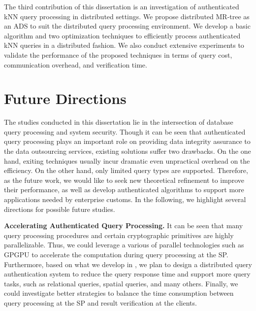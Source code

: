 The third contribution of this dissertation is an investigation of authenticated kNN query processing in distributed settings. We propose distributed MR-tree as an ADS to suit the distributed query processing environment. We develop a basic algorithm and two optimization techniques to efficiently process authenticated kNN queries in a distributed fashion. We also conduct extensive experiments to validate the performance of the proposed techniques in terms of query cost, communication overhead, and verification time.

\section{Future Directions}

The studies conducted in this dissertation lie in the intersection of database query processing and system security. Though it can be seen that authenticated query processing plays an important role on providing data integrity assurance to the data outsourcing services, existing solutions suffer two drawbacks. On the one hand, exiting techniques usually incur dramatic even unpractical overhead on the efficiency. On the other hand, only limited query types are supported. Therefore, as the future work, we would like to seek new theoretical refinement to improve their performance, as well as develop authenticated algorithms to support more applications needed by enterprise customs. In the following, we highlight several directions for possible future studies.

\textbf{Accelerating Authenticated Query Processing.}
It can be seen that many query processing procedures and certain cryptographic primitives are highly parallelizable. Thus, we could leverage a various of parallel technologies such as GPGPU to accelerate the computation during query processing at the SP\@. Furthermore, based on what we develop in , we plan to design a distributed query authentication system to reduce the query response time and support more query tasks, such as relational queries, spatial queries, and many others. Finally, we could investigate better strategies to balance the time consumption between query processing at the SP and result verification at the clients.

